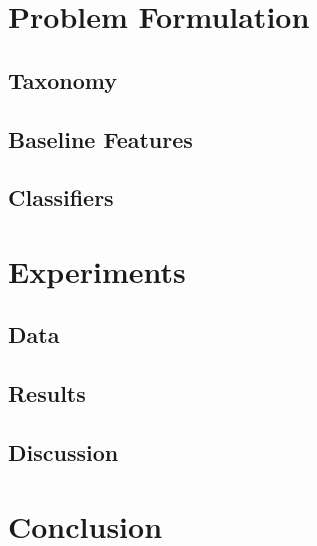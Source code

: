 \documentclass[runningheads]{llncs}
\begin{document}
\section{Problem Formulation}
\subsection{Taxonomy}
\subsection{Baseline Features}
\subsection{Classifiers}
\section{Experiments}
\subsection{Data}
\subsection{Results}
\subsection{Discussion}
\section{Conclusion}



\end{document}
